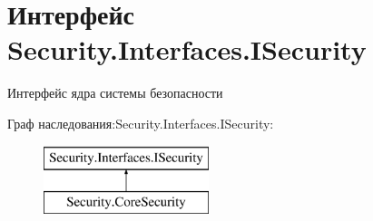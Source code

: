 \hypertarget{interface_security_1_1_interfaces_1_1_i_security}{}\section{Интерфейс Security.\+Interfaces.\+I\+Security}
\label{interface_security_1_1_interfaces_1_1_i_security}


Интерфейс ядра системы безопасности  


Граф наследования\+:Security.\+Interfaces.\+I\+Security\+:\begin{figure}[H]
\begin{center}
\leavevmode
\includegraphics[height=2.000000cm]{d9/d58/interface_security_1_1_interfaces_1_1_i_security}
\end{center}
\end{figure}
